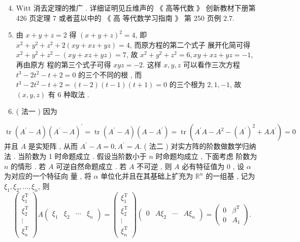 \documentclass[10pt]{article}
\begin{document}
\begin{enumerate}
  \setcounter{enumi}{3}
  \item Witt  消去定理的推广 .  详细证明见丘维声的 《 高等代数 》 创新教材下册第  426  页定理  7  或者蓝以中的 《 高   等代数学习指南 》 第  250  页例  $2.7$.

  \item  由  $x+y+z=2$  得  $(x+y+z)^{2}=4$,  即  $x^{2}+y^{2}+z^{2}+2(x y+x z+y z)=4$,  而原方程的第二个式子   展开化简可得  $x^{2}+y^{2}+z^{2}-(x y+x z+y z)=7$,  故  $x^{2}+y^{2}+z^{2}=6, x y+x z+y z=-1$,  再由原方   程的第三个式子可得  $x y z=-2$.  这样  $x, y, z$  可以看作三次方程  $t^{3}-2 t^{2}-t+2=0$  的三个不同的根 ,  而  $t^{3}-2 t^{2}-t+2=(t-2)(t-1)(t+1)=0$  的三个根为  $2,1,-1$,  故  $(x, y, z)$  有  6  种取法 .

  \item ( 法一 )  因为 

\end{enumerate}
$$
\operatorname{tr}\left(A^{\prime}-A\right)\left(A^{\prime}-A\right)^{\prime}=\operatorname{tr}\left(A^{\prime}-A\right)\left(A-A^{\prime}\right)=\operatorname{tr}\left(A^{\prime} A-A^{2}-\left(A^{\prime}\right)^{2}+A A^{\prime}\right)=0
$$
 并且  $A$  是实矩阵 ,  从而  $A^{\prime}-A=0, A^{\prime}=A$. ( 法二 )  对实方阵的阶数做数学归纳法 .  当阶数为  1  时命题成立 .  假设当阶数小于  $n$  时命题均成立 ,  下面考虑   阶数为  $n$  的情形 .  若  $A$  可逆自然命题成立 .  若  $A$  不可逆 ,  则  $A$  必有特征值为  0 ,  设  $\alpha$  为对应的一个特征向   量 ,  将  $\alpha$  单位化并且在其基础上扩充为  $\mathbb{R}^{n}$  的一组基 ,  记为  $\xi_{1}, \xi_{2}, \ldots, \xi_{n}$,  则 
$$
\left(\begin{array}{c}
\xi_{1}^{\mathrm{T}} \\
\xi_{2}^{\mathrm{T}} \\
\vdots \\
\xi_{n}^{\mathrm{T}}
\end{array}\right) A\left(\begin{array}{llll}
\xi_{1} & \xi_{2} & \cdots & \xi_{n}
\end{array}\right)=\left(\begin{array}{c}
\xi_{1}^{\mathrm{T}} \\
\xi_{2}^{\mathrm{T}} \\
\vdots \\
\xi_{n}^{\mathrm{T}}
\end{array}\right)\left(\begin{array}{llll}
0 & A \xi_{2} & \cdots & A \xi_{n}
\end{array}\right)=\left(\begin{array}{cc}
0 & \beta^{\mathrm{T}} \\
0 & A_{1}
\end{array}\right) .
$$
\end{document}
